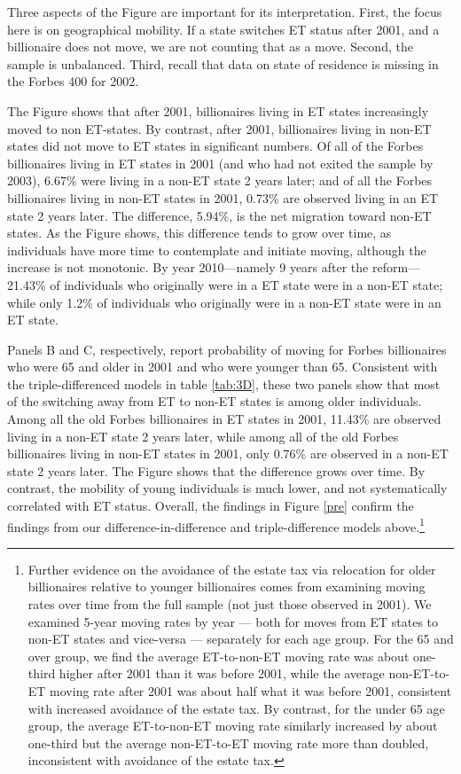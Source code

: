 \documentclass[12pt]{article}
\begin{document}
Three aspects of the Figure are important for its interpretation.  
First, the focus here is on geographical mobility. If a state switches ET status after 2001, and a billionaire does not move, we are not counting that as a move. 
Second, the sample is unbalanced. Third, recall that data on state of residence is missing in the Forbes 400 for 2002. 

The Figure shows that after 2001, billionaires living in ET states increasingly moved to non ET-states. By contrast, after 2001, billionaires living in non-ET states did not move to ET states in significant numbers. 
Of all of the Forbes billionaires living in ET states in 2001 (and who had not exited the sample by 2003), 6.67\% were living in a non-ET state 2 years later; and of all the Forbes billionaires living in non-ET states in 2001, 0.73\% are observed living in an ET state 2 years later. The difference, 5.94\%, is the net migration  toward non-ET states.  As the Figure shows, this difference tends to grow over time, as individuals have more time to contemplate and initiate moving, although the increase is not monotonic. By year 2010---namely 9 years after the reform---21.43\% of individuals who originally were in a ET state were in a non-ET state; while only 1.2\% of individuals who originally were in a non-ET state were in an ET state.

Panels B and C, respectively, report probability of moving for Forbes billionaires who were 65 and older in 2001 and who were younger than 65. Consistent with the triple-differenced models in table \ref{tab:3D}, these two panels show that most of the switching away from ET to non-ET states is among older individuals. 
Among all the old Forbes billionaires in ET states in 2001, 11.43\% are observed living in a non-ET state 2 years later, while among all of the old Forbes billionaires living in non-ET states in 2001, only 0.76\% are observed in a non-ET state 2 years later. The Figure shows that the difference  grows over time. By contrast, the mobility of
young individuals is much lower, and not systematically correlated with ET status. 
Overall, the findings in Figure \ref{pre} confirm the findings from our difference-in-difference and triple-difference models above.\footnote{Further evidence on the avoidance of the estate tax via relocation for older billionaires relative to younger billionaires comes from examining moving rates over time from the full sample (not just those observed in 2001). We examined 5-year moving rates by year — both for moves from ET states to non-ET states and vice-versa — separately for each age group. For the 65 and over group, we find the average ET-to-non-ET moving rate was about one-third higher after 2001 than it was before 2001, while the average non-ET-to-ET moving rate after 2001 was about half what it was before 2001, consistent with increased avoidance of the estate tax. By contrast, for the under 65 age group, the average ET-to-non-ET moving rate similarly increased by about one-third but the average non-ET-to-ET moving rate more than doubled, inconsistent with avoidance of the estate tax.}
\end{document}
